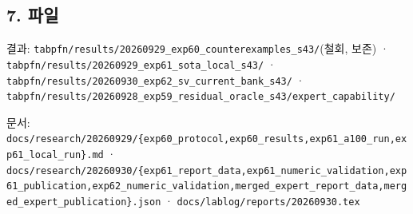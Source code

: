 \subsection{7. 파일}
\par\noindent \textbullet\enspace 결과: \texttt{tabpfn/\allowbreak{}\allowbreak{}r\allowbreak{}esults/\allowbreak{}\allowbreak{}2\allowbreak{}0260929\_\allowbreak{}\allowbreak{}exp60\_\allowbreak{}\allowbreak{}co\allowbreak{}unterexa\allowbreak{}mples\_\allowbreak{}\allowbreak{}s4\allowbreak{}3/\allowbreak{}\allowbreak{}}(철회, 보존) · \texttt{tabpfn/\allowbreak{}\allowbreak{}r\allowbreak{}esults/\allowbreak{}\allowbreak{}2\allowbreak{}0260929\_\allowbreak{}\allowbreak{}exp61\_\allowbreak{}\allowbreak{}so\allowbreak{}ta\_\allowbreak{}\allowbreak{}local\allowbreak{}\_\allowbreak{}\allowbreak{}s43/\allowbreak{}\allowbreak{}} · \texttt{tabpfn/\allowbreak{}\allowbreak{}r\allowbreak{}esults/\allowbreak{}\allowbreak{}2\allowbreak{}0260930\_\allowbreak{}\allowbreak{}exp62\_\allowbreak{}\allowbreak{}sv\allowbreak{}\_\allowbreak{}\allowbreak{}current\allowbreak{}\_\allowbreak{}\allowbreak{}bank\_\allowbreak{}\allowbreak{}s4\allowbreak{}3/\allowbreak{}\allowbreak{}} · \texttt{tabpfn/\allowbreak{}\allowbreak{}r\allowbreak{}esults/\allowbreak{}\allowbreak{}2\allowbreak{}0260928\_\allowbreak{}\allowbreak{}exp59\_\allowbreak{}\allowbreak{}re\allowbreak{}sidual\_\allowbreak{}\allowbreak{}o\allowbreak{}racle\_\allowbreak{}\allowbreak{}s4\allowbreak{}3/\allowbreak{}\allowbreak{}expert\allowbreak{}\_\allowbreak{}\allowbreak{}capabil\allowbreak{}ity/\allowbreak{}\allowbreak{}}


\par\noindent \textbullet\enspace 문서: \texttt{docs/\allowbreak{}\allowbreak{}res\allowbreak{}earch/\allowbreak{}\allowbreak{}20\allowbreak{}260929/\allowbreak{}\allowbreak{}\{\allowbreak{}exp60\_\allowbreak{}\allowbreak{}pr\allowbreak{}otocol,\allowbreak{}e\allowbreak{}xp60\_\allowbreak{}\allowbreak{}res\allowbreak{}ults,\allowbreak{}exp\allowbreak{}61\_\allowbreak{}\allowbreak{}a100\_\allowbreak{}\allowbreak{}run,\allowbreak{}exp6\allowbreak{}1\_\allowbreak{}\allowbreak{}local\_\allowbreak{}\allowbreak{}run\}\allowbreak{}.\allowbreak{}md} · \texttt{docs/\allowbreak{}\allowbreak{}res\allowbreak{}earch/\allowbreak{}\allowbreak{}20\allowbreak{}260930/\allowbreak{}\allowbreak{}\{\allowbreak{}exp61\_\allowbreak{}\allowbreak{}re\allowbreak{}port\_\allowbreak{}\allowbreak{}dat\allowbreak{}a,\allowbreak{}exp61\_\allowbreak{}\allowbreak{}numeric\_\allowbreak{}\allowbreak{}validati\allowbreak{}on,\allowbreak{}exp61\allowbreak{}\_\allowbreak{}\allowbreak{}publica\allowbreak{}tion,\allowbreak{}exp\allowbreak{}62\_\allowbreak{}\allowbreak{}numer\allowbreak{}ic\_\allowbreak{}\allowbreak{}valid\allowbreak{}ation,\allowbreak{}me\allowbreak{}rged\_\allowbreak{}\allowbreak{}exp\allowbreak{}ert\_\allowbreak{}\allowbreak{}repo\allowbreak{}rt\_\allowbreak{}\allowbreak{}data,\allowbreak{}merged\_\allowbreak{}\allowbreak{}e\allowbreak{}xpert\_\allowbreak{}\allowbreak{}pu\allowbreak{}blicatio\allowbreak{}n\}\allowbreak{}.\allowbreak{}json} · \texttt{docs/\allowbreak{}\allowbreak{}lab\allowbreak{}log/\allowbreak{}\allowbreak{}repo\allowbreak{}rts/\allowbreak{}\allowbreak{}2026\allowbreak{}0930.\allowbreak{}tex\allowbreak{}}


